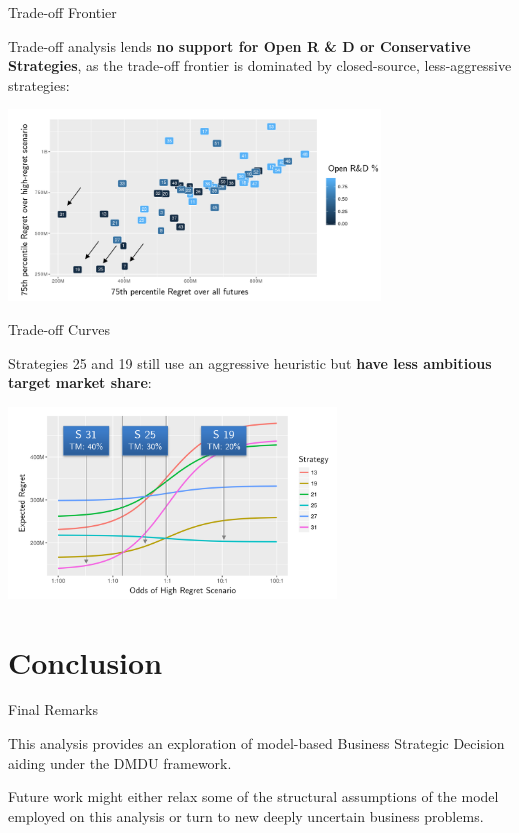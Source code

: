 \documentclass[12pt,ignorenonframetext,]{beamer}
\begin{document}
\begin{frame}{Trade-off Frontier}
\protect\hypertarget{trade-off-frontier}{}

Trade-off analysis lends \textbf{no support for Open R \& D or
Conservative Strategies}, as the trade-off frontier is dominated by
closed-source, less-aggressive strategies:

\centerline{\includegraphics[height=2in]{images/tradeoff-frontier.png}}

\end{frame}

\begin{frame}{Trade-off Curves}
\protect\hypertarget{trade-off-curves}{}

Strategies 25 and 19 still use an aggressive heuristic but \textbf{have
less ambitious target market share}:

\centerline{\includegraphics[height=2in]{images/tradeoff-analysis.png}}

\end{frame}

\hypertarget{conclusion}{%
\section{Conclusion}\label{conclusion}}

\begin{frame}{Final Remarks}
\protect\hypertarget{final-remarks}{}

This analysis provides an exploration of model-based Business Strategic
Decision aiding under the DMDU framework.

Future work might either relax some of the structural assumptions of the
model employed on this analysis or turn to new deeply uncertain business
problems.

\end{frame}
\end{document}

